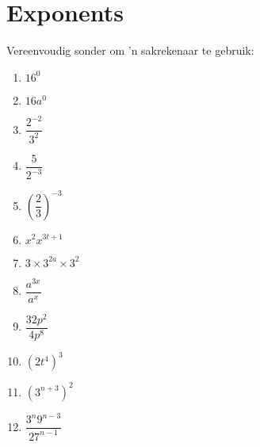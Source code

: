 \chapter{Exponents}
\begin{exercises}{}{
Vereenvoudig sonder om ’n sakrekenaar te gebruik:
\begin{multicols}{2}
\begin{enumerate}[label=\textbf{\arabic*}., itemsep=4pt]
 \item $16^0$
 \item $16a^0$
 \item $\dfrac{2^{-2}}{3^2}$
 \item $ \dfrac{5}{2^{-3}}$
 \item $ \left(\dfrac{2}{3}\right)^{-3} $
 \item $ x^2 x^{3t+1} $
 \item $ 3 \times 3^{2a} \times 3^2$
 \item $ \dfrac{a^{3x}}{a^x} $
 \item $ \dfrac{32p^2}{4p^8}$
 \item $ (2t^4)^3$
 \item $ (3^{n+3})^2$
 \item $ \dfrac{3^n 9^{n-3}}{27^{n-1}}$
\end{enumerate}
\end{multicols}
}
\end{exercises}


